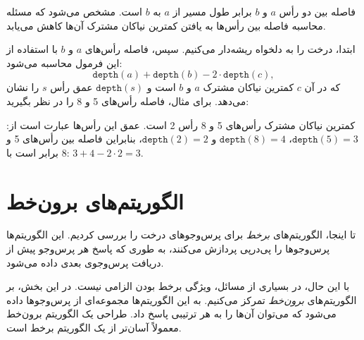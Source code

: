 فاصله بین دو رأس $a$ و $b$
برابر طول مسیر از $a$ به $b$ است.
مشخص می‌شود که مسئله محاسبه
فاصله بین رأس‌ها به یافتن
کمترین نیاکان مشترک آن‌ها کاهش می‌یابد.

ابتدا، درخت را به دلخواه ریشه‌دار می‌کنیم.
سپس، فاصله رأس‌های $a$ و $b$
با استفاده از این فرمول محاسبه می‌شود:
\[\texttt{depth}(a)+\texttt{depth}(b)-2 \cdot \texttt{depth}(c),\]
که در آن $c$ کمترین نیاکان مشترک $a$ و $b$ است
و $\texttt{depth}(s)$ عمق رأس $s$ را نشان می‌دهد.
برای مثال، فاصله رأس‌های 5 و 8 را در نظر بگیرید:
\begin{center}
\end{center}

کمترین نیاکان مشترک رأس‌های 5 و 8 رأس 2 است.
عمق این رأس‌ها عبارت است از:
$\texttt{depth}(5)=3$، $\texttt{depth}(8)=4$ و $\texttt{depth}(2)=2$،
بنابراین فاصله بین رأس‌های 5 و 8 برابر است با:
$3+4-2\cdot2=3$.

\section{الگوریتم‌های برون‌خط}

تا اینجا، الگوریتم‌های \emph{برخط}
برای پرس‌وجوهای درخت را بررسی کردیم.
این الگوریتم‌ها پرس‌وجوها را پی‌درپی پردازش می‌کنند،
به طوری که پاسخ هر پرس‌وجو پیش از دریافت پرس‌وجوی بعدی داده می‌شود.

با این حال، در بسیاری از مسائل، ویژگی
برخط بودن الزامی نیست.
در این بخش، بر الگوریتم‌های \emph{برون‌خط} تمرکز می‌کنیم.
به این الگوریتم‌ها مجموعه‌ای از پرس‌وجوها داده می‌شود که می‌توان
آن‌ها را به هر ترتیبی پاسخ داد.
طراحی یک الگوریتم برون‌خط معمولاً آسان‌تر
از یک الگوریتم برخط است.

